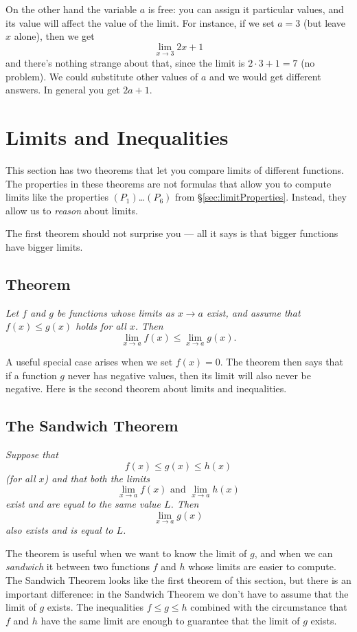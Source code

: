 On the other hand the variable $a$ is free: you can assign it particular
values, and its value will affect the value of the limit.  For instance, if
we set $a=3$ (but leave $x$ alone), then we get
\[
\lim_{x\to 3} 2x+1
\]
and there's nothing strange about that, since the limit is $2\cdot3+1=7$ (no
problem).  We could substitute other values of $a$ and we would get
different answers. In general you get $2a+1$.

\section{Limits and Inequalities} 
\label{sec:limits-and-inequalities}%
This section has two theorems that let you compare limits of different
functions.  The properties in these theorems are not formulas that
allow you to compute limits like the properties $(P_1)$\ldots$(P_6)$
from \S\ref{sec:limitProperties}.  Instead, they allow us to
\emph{reason} about limits.

The first theorem should not surprise you --- all it says is that bigger
functions have bigger limits.

\subsection{Theorem} 
\itshape
Let $f$ and $g$ be functions whose limits as $x\to a$ exist, and assume
that $f(x)\leq g(x)$ holds for all $x$.  Then
\[
\lim_{x\to a}f(x) \leq \lim_{x\to a} g(x).
\]
\upshape

A useful special case arises when we set $f(x)=0$.  The theorem then says
that if a function $g$ never has negative values, then its limit will also
never be negative.
Here is the second theorem about limits and inequalities.

\subsection{The Sandwich Theorem} 
\itshape
Suppose that
\[
f(x)\le g(x)\le h(x)
\]
(for all $x$) and that both the limits
\[
  \lim_{x\to a} f(x) \text{ and } \lim_{x\to a} h(x)
\]
exist and are equal to the same value $L$. Then
\[
\lim_{x\to a} g(x)
\]
also exists and is equal to $L$.
\upshape

The theorem is useful when we want to know the limit of $g$, and when we
can \emph{sandwich} it between two functions $f$ and $h$ whose limits are
easier to compute.  The Sandwich Theorem looks like the first theorem of
this section, but there is an important difference: in the Sandwich Theorem
we don't have to assume that the limit of $g$ exists.  The inequalities
$f\leq g\leq h$ combined with the circumstance that $f$ and $h$ have the
same limit are enough to guarantee that the limit of $g$ exists.

